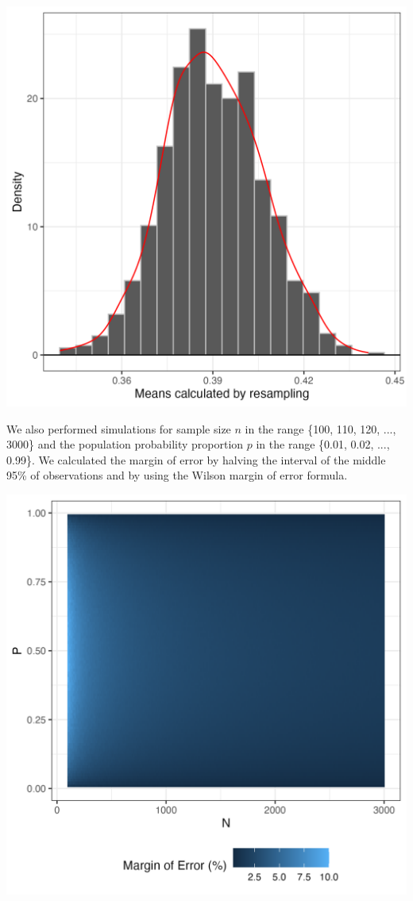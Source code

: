 \documentclass{article}\usepackage[]{graphicx}\usepackage[]{xcolor}
\newenvironment{Figure}
  {\par\medskip\noindent\minipage{\linewidth}}
  {\endminipage\par\medskip}
\begin{document}
\begin{multicols}{2}
\begin{Figure}
 \centering
 \includegraphics[width = 0.5\linewidth]{resample.png}
 \label{fig:res}
\end{Figure}

We also performed simulations for sample size $n$ in the range \{100, 110, 120, ..., 3000\} and the population probability proportion $p$ in the range \{0.01, 0.02, ..., 0.99\}. We calculated the margin of error by halving the interval of the middle 95\% of observations and by using the Wilson margin of error formula.

\begin{Figure}
 \centering
 \includegraphics[width =0.7\linewidth]{error.png}
 \label{fig:err}
\end{Figure}


\end{multicols}
\end{document}

